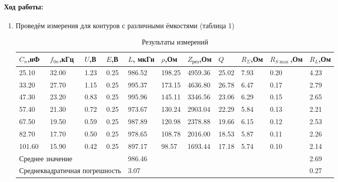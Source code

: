 \documentclass[a4paper,12pt]{article}
\begin{document}
\paragraph{Ход работы:}
\begin{enumerate}
\itemsep0em
\item Проведём измерения для контуров с различными ёмкостями (таблица 1)


\begin{table}[h]
\centering
\footnotesize
\begin{tabular}{|llll|l|l|l|l|l|l|l|}
\hline
\multicolumn{1}{|l|}{$C_n$,нФ} & \multicolumn{1}{l|}{$f_{0n}$,кГц} & \multicolumn{1}{l|}{$U$,В} & $E$,В & $L$, мкГн & $\rho$,Ом & $Z_\text{рез}$,Ом & $Q$ & $R_\Sigma$,Ом & $R_{S \max}$,Ом & $R_L$,Ом \\ \hline
\multicolumn{1}{|l|}{25.10} & \multicolumn{1}{l|}{32.00} & \multicolumn{1}{l|}{1.23} & 0.25 & 986.52 & 198.25 & 4959.36 & 25.02 & 7.93 & 0.20 & 4.23 \\
\multicolumn{1}{|l|}{33.20} & \multicolumn{1}{l|}{27.70} & \multicolumn{1}{l|}{1.15} & 0.25 & 995.37 & 173.15 & 4636.80 & 26.78 & 6.47 & 0.17 & 2.79 \\
\multicolumn{1}{|l|}{47.30} & \multicolumn{1}{l|}{23.20} & \multicolumn{1}{l|}{0.83} & 0.25 & 995.96 & 145.11 & 3346.56 & 23.06 & 6.29 & 0.15 & 2.65 \\
\multicolumn{1}{|l|}{57.40} & \multicolumn{1}{l|}{21.30} & \multicolumn{1}{l|}{0.72} & 0.25 & 973.67 & 130.24 & 2903.04 & 22.29 & 5.84 & 0.13 & 2.21 \\
\multicolumn{1}{|l|}{67.50} & \multicolumn{1}{l|}{19.50} & \multicolumn{1}{l|}{0.59} & 0.25 & 987.89 & 120.98 & 2378.88 & 19.66 & 6.15 & 0.12 & 2.53 \\
\multicolumn{1}{|l|}{82.70} & \multicolumn{1}{l|}{17.70} & \multicolumn{1}{l|}{0.50} & 0.25 & 978.65 & 108.78 & 2016.00 & 18.53 & 5.87 & 0.11 & 2.26 \\
\multicolumn{1}{|l|}{101.60} & \multicolumn{1}{l|}{15.90} & \multicolumn{1}{l|}{0.42} & 0.25 & 897.17 & 98.57 & 1693.44 & 17.18 & 5.74 & 0.10 & 2.14 \\ \hline
\multicolumn{4}{|l|}{Среднее значение} & 986.46 &  &  &  &  &  & 2.69 \\ \hline
\multicolumn{4}{|l|}{Среднеквадратичная погрешность} & 3.07 &  &  &  &  &  & 0.27 \\ \hline
\end{tabular}
\caption{Результаты измерений}
\end{table}


\end{enumerate}
\end{document}
